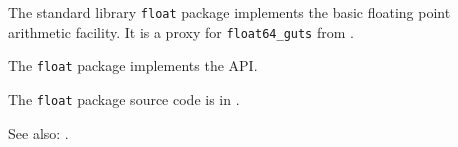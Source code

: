 
The standard library {\tt float} package implements the basic floating point arithmetic facility. 
It is a proxy for {\tt float64\_guts} from .

The {\tt float} package implements the  API.

The {\tt float} package source code is in .

See also:  .


